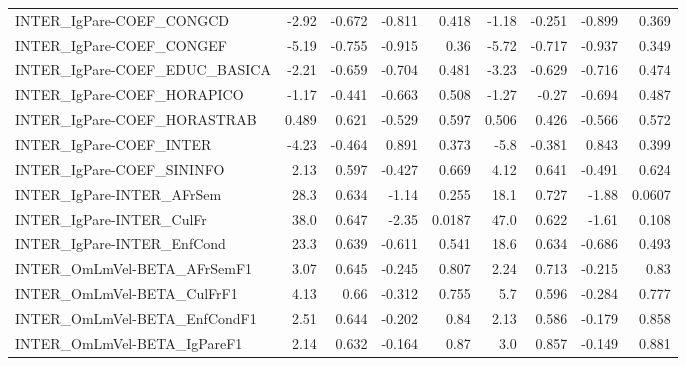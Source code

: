 \begin{tabular}{lrrrrrrrr}
INTER\_IgPare-COEF\_CONGCD              &       -2.92 &       -0.672 &  -0.811 &    0.418 &      -1.18 &      -0.251 &       -0.899 &         0.369 \\
INTER\_IgPare-COEF\_CONGEF              &       -5.19 &       -0.755 &  -0.915 &     0.36 &      -5.72 &      -0.717 &       -0.937 &         0.349 \\
INTER\_IgPare-COEF\_EDUC\_BASICA         &       -2.21 &       -0.659 &  -0.704 &    0.481 &      -3.23 &      -0.629 &       -0.716 &         0.474 \\
INTER\_IgPare-COEF\_HORAPICO            &       -1.17 &       -0.441 &  -0.663 &    0.508 &      -1.27 &       -0.27 &       -0.694 &         0.487 \\
INTER\_IgPare-COEF\_HORASTRAB           &       0.489 &        0.621 &  -0.529 &    0.597 &      0.506 &       0.426 &       -0.566 &         0.572 \\
INTER\_IgPare-COEF\_INTER               &       -4.23 &       -0.464 &   0.891 &    0.373 &       -5.8 &      -0.381 &        0.843 &         0.399 \\
INTER\_IgPare-COEF\_SININFO             &        2.13 &        0.597 &  -0.427 &    0.669 &       4.12 &       0.641 &       -0.491 &         0.624 \\
INTER\_IgPare-INTER\_AFrSem             &        28.3 &        0.634 &   -1.14 &    0.255 &       18.1 &       0.727 &        -1.88 &        0.0607 \\
INTER\_IgPare-INTER\_CulFr              &        38.0 &        0.647 &   -2.35 &   0.0187 &       47.0 &       0.622 &        -1.61 &         0.108 \\
INTER\_IgPare-INTER\_EnfCond            &        23.3 &        0.639 &  -0.611 &    0.541 &       18.6 &       0.634 &       -0.686 &         0.493 \\
INTER\_OmLmVel-BETA\_AFrSemF1           &        3.07 &        0.645 &  -0.245 &    0.807 &       2.24 &       0.713 &       -0.215 &          0.83 \\
INTER\_OmLmVel-BETA\_CulFrF1            &        4.13 &         0.66 &  -0.312 &    0.755 &        5.7 &       0.596 &       -0.284 &         0.777 \\
INTER\_OmLmVel-BETA\_EnfCondF1          &        2.51 &        0.644 &  -0.202 &     0.84 &       2.13 &       0.586 &       -0.179 &         0.858 \\
INTER\_OmLmVel-BETA\_IgPareF1           &        2.14 &        0.632 &  -0.164 &     0.87 &        3.0 &       0.857 &       -0.149 &         0.881 \\

\end{tabular}
